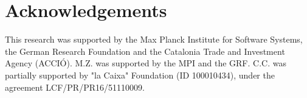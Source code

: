 \section{Acknowledgements}

This research was supported by the Max Planck Institute for Software Systems, the German Research Foundation and the Catalonia Trade
and Investment Agency (ACCI{\'O}).
%
M.Z. was supported by the MPI and the GRF.
%
C.C. was partially supported by "la Caixa" Foundation (ID 100010434), under the agreement LCF/PR/PR16/51110009.
%
